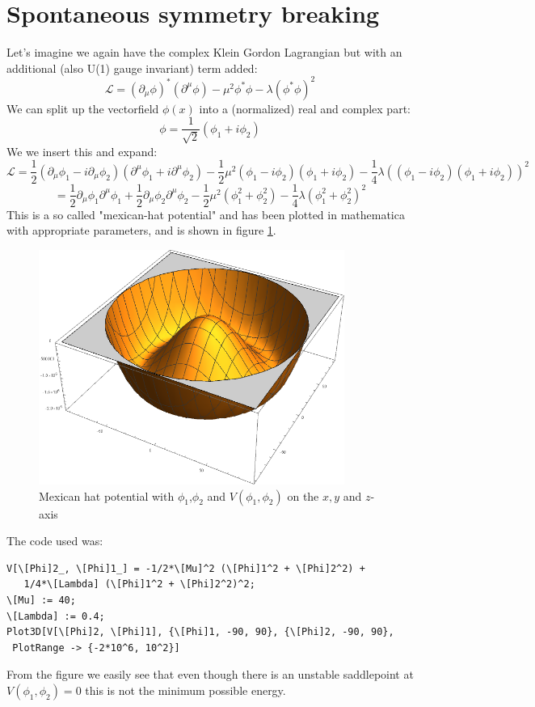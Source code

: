 \documentclass[a4,10pt,titlepage]{article}
\renewcommand\[{\begin{equation*}}
\renewcommand\]{\end{equation*}}
\newcommand{\be}{\begin{equation}}
\newcommand{\ee}{\end{equation}}
\numberwithin{equation}{section}
\newcommand{\lp}{\left}
\newcommand{\rp}{\right}
\newcommand{\Lar}{\mathscr{L}}
\newcommand{\half}{\frac{1}{2}}
\begin{document}
\section{Spontaneous symmetry breaking}
Let's imagine we again have the complex Klein Gordon Lagrangian but with an additional (also U(1) gauge invariant) term added:
\be
\Lar=\lp(\partial_\mu\phi\rp)^*\lp(\partial^\mu\phi\rp)-\mu^2\phi^*\phi-\lambda\lp(\phi^*\phi \rp)^2
\ee
We can split up the vectorfield $\phi(x)$ into a (normalized) real and complex part:
\[
\phi=\frac{1}{\sqrt{2}}\lp(\phi_1+i\phi_2 \rp)
\]
We we insert this and expand:
\[
\Lar=\half(\partial_\mu\phi_1-i\partial_\mu\phi_2)(\partial^\mu\phi_1+i\partial^\mu\phi_2)-\half\mu^2(\phi_1-i\phi_2)(\phi_1+i\phi_2)-\frac{1}{4}\lambda\lp((\phi_1-i\phi_2)(\phi_1+i\phi_2)\rp)^2
\]
\[
=\half\partial_\mu\phi_1\partial^\mu\phi_1+\half\partial_\mu\phi_2\partial^\mu\phi_2-\half\mu^2\lp( \phi_1^2+\phi_2^2\rp)-\frac{1}{4}\lambda\lp( \phi_1^2+\phi_2^2\rp)^2
\]
This is a so called "mexican-hat potential" and has been plotted in mathematica with appropriate parameters, and is shown in figure \ref{fig:my_label1}.
\begin{figure}[htb]
    \centering
    \includegraphics[width=10cm]{mexican_hat.png}
    \caption{Mexican hat potential with $\phi_1$,$\phi_2$ and $V(\phi_1,\phi_2)$ on the $x,y$ and $z$-axis}
    \label{fig:my_label1}
\end{figure}
The code used was:
\begin{lstlisting}
V[\[Phi]2_, \[Phi]1_] = -1/2*\[Mu]^2 (\[Phi]1^2 + \[Phi]2^2) + 
   1/4*\[Lambda] (\[Phi]1^2 + \[Phi]2^2)^2;
\[Mu] := 40;
\[Lambda] := 0.4;
Plot3D[V[\[Phi]2, \[Phi]1], {\[Phi]1, -90, 90}, {\[Phi]2, -90, 90}, 
 PlotRange -> {-2*10^6, 10^2}]
\end{lstlisting}
From the figure we easily see that even though there is an unstable saddlepoint at $V(\phi_1,\phi_2)=0$ this is not the minimum possible energy.
\end{document}
